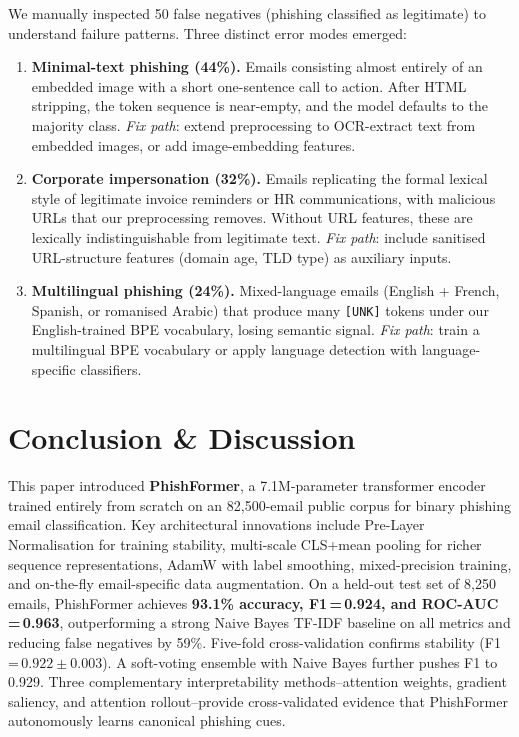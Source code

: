 \documentclass[sigconf, nonacm]{acmart}
\begin{document}
We manually inspected 50 false negatives (phishing classified as
legitimate) to understand failure patterns.
Three distinct error modes emerged:
\begin{enumerate}[leftmargin=*,noitemsep,topsep=2pt]
  \item \textbf{Minimal-text phishing (44\%).}  Emails consisting
    almost entirely of an embedded image with a short one-sentence
    call to action.
    After HTML stripping, the token sequence is near-empty, and the
    model defaults to the majority class.
    \emph{Fix path}: extend preprocessing to OCR-extract text from
    embedded images, or add image-embedding features.
  \item \textbf{Corporate impersonation (32\%).}  Emails replicating
    the formal lexical style of legitimate invoice reminders or HR
    communications, with malicious URLs that our preprocessing
    removes.
    Without URL features, these are lexically indistinguishable from
    legitimate text.
    \emph{Fix path}: include sanitised URL-structure features
    (domain age, TLD type) as auxiliary inputs.
  \item \textbf{Multilingual phishing (24\%).}  Mixed-language emails
    (English + French, Spanish, or romanised Arabic) that produce
    many \texttt{[UNK]} tokens under our English-trained BPE
    vocabulary, losing semantic signal.
    \emph{Fix path}: train a multilingual BPE vocabulary or apply
    language detection with language-specific classifiers.
\end{enumerate}

\section{Conclusion \& Discussion}

This paper introduced \textbf{PhishFormer}, a 7.1M-parameter
transformer encoder trained entirely from scratch on an 82{,}500-email
public corpus for binary phishing email classification.
Key architectural innovations include Pre-Layer Normalisation for
training stability, multi-scale CLS+mean pooling for richer sequence
representations, AdamW with label smoothing, mixed-precision training,
and on-the-fly email-specific data augmentation.
On a held-out test set of 8{,}250 emails, PhishFormer achieves
\textbf{93.1\% accuracy, F1\,=\,0.924, and ROC-AUC\,=\,0.963},
outperforming a strong Naive Bayes TF-IDF baseline on all metrics and
reducing false negatives by 59\%.
Five-fold cross-validation confirms stability (F1\,=\,$0.922\pm0.003$).
A soft-voting ensemble with Naive Bayes further pushes F1 to 0.929.
Three complementary interpretability methods--attention weights,
gradient saliency, and attention rollout--provide cross-validated
evidence that PhishFormer autonomously learns canonical phishing cues.
\end{document}
